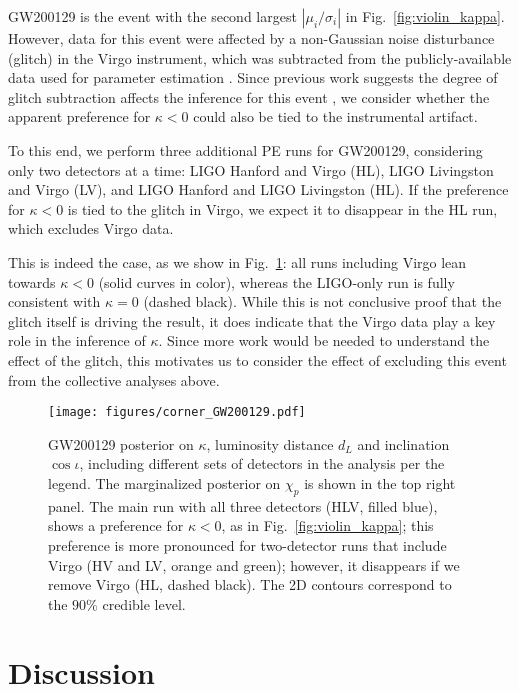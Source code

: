 \documentclass[aps,prd,twocolumn,superscriptaddress,preprintnumbers,floatfix,nofootinbib]{revtex4-2}
\begin{document}
GW200129 is the event with the second largest $|\mu_i/\sigma_i|$ in Fig.~\ref{fig:violin_kappa}.
However, data for this event were affected by a non-Gaussian noise disturbance (glitch) in the Virgo instrument, which was subtracted from the publicly-available data used for parameter estimation \cite{Davis:2022ird}.
Since previous work suggests the degree of glitch subtraction affects the inference for this event \citep{GW200129_glitch}, we consider whether the apparent preference for $\kappa < 0$ could also be tied to the instrumental artifact.

To this end, we perform three additional \ac{PE} runs for GW200129, considering only two detectors at a time: LIGO Hanford and Virgo (HL), LIGO Livingston and Virgo (LV), and LIGO Hanford and LIGO Livingston (HL).
If the preference for $\kappa < 0$ is tied to the glitch in Virgo, we expect it to disappear in the HL run, which excludes Virgo data.

This is indeed the case, as we show in Fig.~\ref{fig:corner_GW200129}: all runs including Virgo lean towards $\kappa < 0$ (solid curves in color), whereas the LIGO-only run is fully consistent with $\kappa = 0$ (dashed black).
While this is not conclusive proof that the glitch itself is driving the result, it does indicate that the Virgo data play a key role in the inference of $\kappa$.
Since more work would be needed to understand the effect of the glitch, this motivates us to consider the effect of excluding this event from the collective analyses above.

\begin{figure}
    \texttt{[image: figures/corner\_GW200129.pdf]}
    \caption{
        GW200129 posterior on $\kappa$, luminosity distance $d_L$ and inclination $\cos{\iota}$, including different sets of detectors in the analysis per the legend.
        The marginalized posterior on $\chi_p$ is shown in the top right panel.
        The main run with all three detectors (HLV, filled blue), shows a preference for $\kappa < 0$, as in Fig.~\ref{fig:violin_kappa}; this preference is more pronounced for two-detector runs that include Virgo (HV and LV, orange and green); however, it disappears if we remove Virgo (HL, dashed black).
        The 2D contours correspond to the $90\%$ credible level.
    }
    \label{fig:corner_GW200129}
\end{figure}

\section{Discussion}
\label{sec:Discussion}
\end{document}
